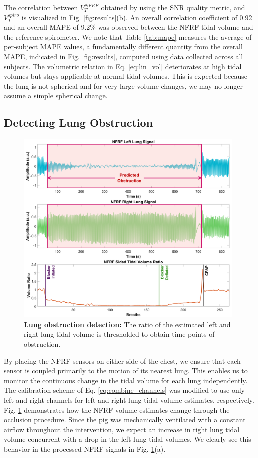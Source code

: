 \documentclass[journal]{IEEEtran}
\begin{document}
\hspace{-0.5em}The correlation between $V^{NFRF}_T$ obtained by using the SNR quality metric, and $V^{spiro}_T$ is visualized in Fig. \ref{fig:results}(b). An overall correlation coefficient of 0.92 and an overall MAPE of 9.2\% was observed between the NFRF tidal volume and the reference spirometer. We note that Table \ref{tab:mape} measures the average of per-subject MAPE values, a fundamentally different quantity from the overall MAPE, indicated in Fig. \ref{fig:results}, computed using data collected across all subjects. The volumetric relation in Eq. \ref{eq:lin_vol} deteriorates at high tidal volumes but stays applicable at normal tidal volumes. This is expected because the lung is not spherical and for very large volume changes, we may no longer assume a simple spherical change.  
\subsection{Detecting Lung Obstruction}
\begin{figure}[ht]
    \centering
    \includegraphics[width=0.98\textwidth]{occlusion_lr.jpg}
    \caption{\textbf{Lung obstruction detection:} The ratio of the estimated left and right lung tidal volume is thresholded to obtain time points of obstruction.}
    \label{fig:occlusion_lr}
\end{figure}
By placing the NFRF sensors on either side of the chest, we ensure that each sensor is coupled primarily to the motion of its nearest lung. This enables us to monitor the continuous change in the tidal volume for each lung independently. The calibration scheme of Eq. \ref{eq:combine_channels} was modified to use only left and right channels for left and right lung tidal volume estimates, respectively. Fig. \ref{fig:occlusion_lr} demonstrates how the NFRF volume estimates change through the occlusion procedure. Since the pig was mechanically ventilated with a constant airflow throughout the intervention, we expect an increase in right lung tidal volume concurrent with a drop in the left lung tidal volumes. We clearly see this behavior in the processed NFRF signals in Fig. \ref{fig:occlusion_lr}(a). \\
\end{document}
